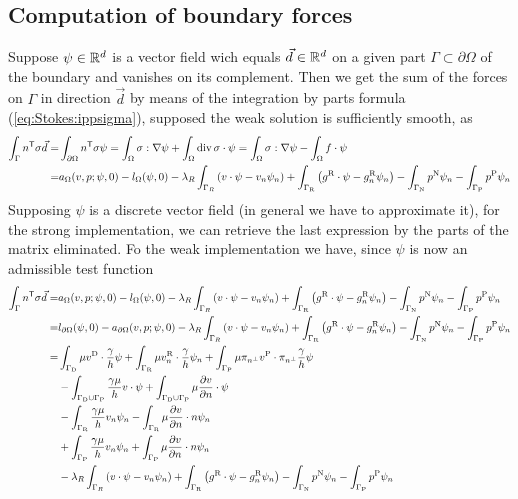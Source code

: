 \subsection{Computation of boundary forces}\label{subsec:}
%
Suppose $\psi\in\mathbb R^d$ is a vector field wich equals $\vec{d}\in\mathbb R^d$ on a given part $\Gamma\subset\partial\Omega$ of the boundary and vanishes on its complement. Then we get the sum of the forces on $\Gamma$ in direction $\vec{d}$ by means of the integration by parts formula (\ref{eq:Stokes:ippsigma}), supposed the weak solution is sufficiently smooth, as
%
\begin{align*}
\int_{\Gamma} {n}^{\mathsf{T}}\sigma \vec{d} =& \int_{\partial\Omega} {n}^{\mathsf{T}}\sigma \psi
=\int_{\Omega} \sigma:\nabla\psi  + \int_{\Omega} \operatorname{div} \sigma\cdot \psi
=\int_{\Omega} \sigma:\nabla\psi  -\int_{\Omega} f\cdot \psi\\
=& a_{\Omega}(v,p; \psi,0) - l_{\Omega}(\psi,0) - \lambda_R\int_{\Gamma_R}\left(v\cdot\psi - v_n\psi_n\right)+ \int_{\Gamma_{\rm R}}\left(g^{\rm R}\cdot\psi - g^{\rm R}_n\psi_n\right)
 -\int_{\Gamma_{\rm N}}p^{\rm N} \psi_n -\int_{\Gamma_{\rm P}}p^{\rm P} \psi_n
\end{align*}
%
Supposing $\psi$ is a discrete vector field (in general we have to approximate it), for the strong implementation, we can retrieve the last expression by the parts of the matrix eliminated.
Fo the weak implementation we have, since $\psi$ is now an admissible test function
%
\begin{align*}
\int_{\Gamma} {n}^{\mathsf{T}}\sigma \vec{d} =&a_{\Omega}(v,p; \psi,0) - l_{\Omega}(\psi,0) - \lambda_R\int_{\Gamma_R}\left(v\cdot\psi - v_n\psi_n\right)+ \int_{\Gamma_{\rm R}}\left(g^{\rm R}\cdot\psi - g^{\rm R}_n\psi_n\right)
 -\int_{\Gamma_{\rm N}}p^{\rm N} \psi_n-\int_{\Gamma_{\rm P}}p^{\rm P} \psi_n\\
=&  l_{\partial\Omega}(\psi,0) - a_{\partial\Omega}(v,p; \psi,0) - \lambda_R\int_{\Gamma_R}\left(v\cdot\psi - v_n\psi_n\right)+ \int_{\Gamma_{\rm R}}\left(g^{\rm R}\cdot\psi - g^{\rm R}_n\psi_n\right)
 -\int_{\Gamma_{\rm N}}p^{\rm N} \psi_n-\int_{\Gamma_{\rm P}}p^{\rm P} \psi_n\\
 =&
 \int_{\Gamma_{\rm D}}\mu v^{\rm D}\cdot \frac{\gamma}{h}\psi 
+ \int_{\Gamma_{\rm R}}\mu v^{\rm R}_n\cdot\frac{\gamma}{h}\psi_n
+ \int_{\Gamma_{\rm P}}\mu\pi_{n^{\perp}}v^{\rm P}\cdot\pi_{n^{\perp}} \frac{\gamma}{h}\psi \\
&- \int_{\Gamma_{\rm D}\cup\Gamma_{\rm P}}\frac{\gamma\mu}{h}v\cdot\psi + 
 \int_{\Gamma_{\rm D}\cup\Gamma_{\rm P}}\mu  \frac{\partial v}{\partial n}\cdot  \psi \\
 &-\int_{\Gamma_{\rm R}}\frac{\gamma\mu}{h}v_n\psi_n - \int_{\Gamma_{\rm R}} \mu \frac{\partial v}{\partial n}\cdot n \psi_n \\
 &+\int_{\Gamma_{\rm P}}\frac{\gamma\mu}{h}v_n\psi_n + \int_{\Gamma_{\rm P}} \mu \frac{\partial v}{\partial n}\cdot n \psi_n \\
 &- \lambda_R\int_{\Gamma_R}\left(v\cdot\psi - v_n\psi_n\right)+ \int_{\Gamma_{\rm R}}\left(g^{\rm R}\cdot\psi - g^{\rm R}_n\psi_n\right)
 -\int_{\Gamma_{\rm N}}p^{\rm N} \psi_n-\int_{\Gamma_{\rm P}}p^{\rm P} \psi_n
\end{align*}

